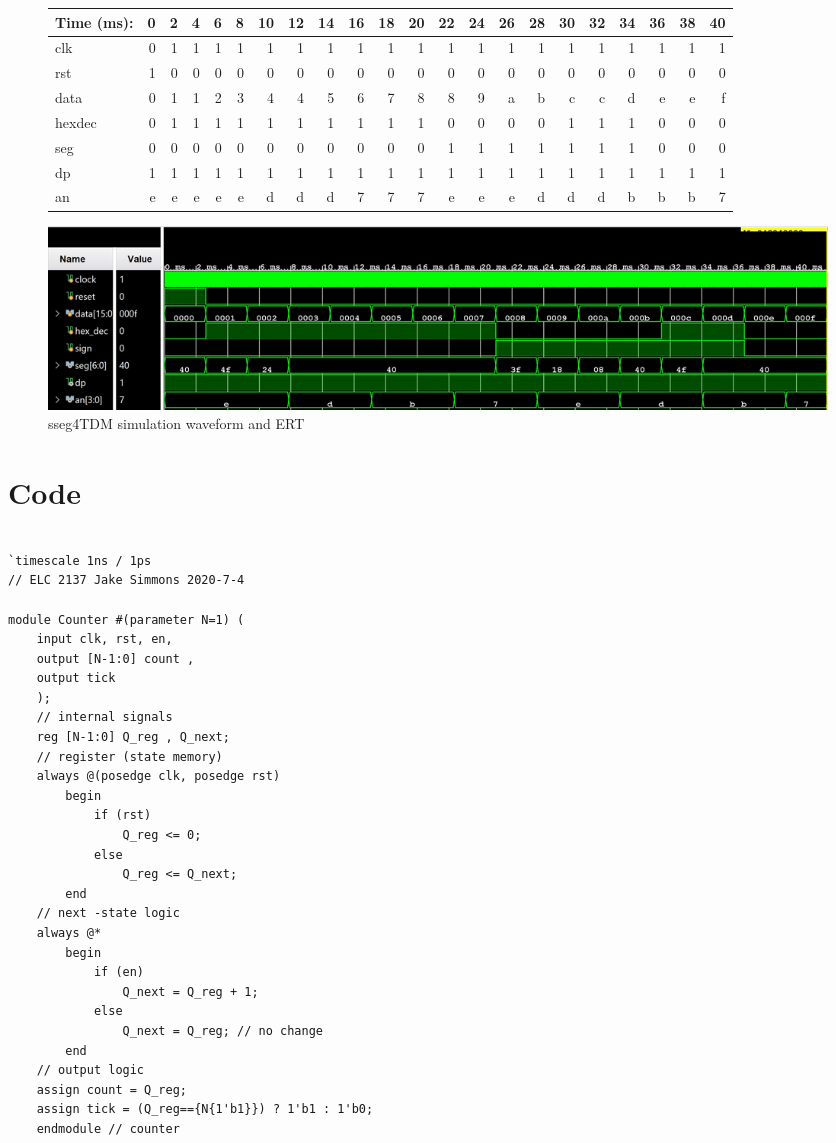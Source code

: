\documentclass[11pt]{article}
\begin{document}
\begin{figure}[ht]\centering
	\begin{tabular}{l|rrrrrrrrrrrrrrrrrrrrr}
		Time (ms): & 0 & 2 & 4 & 6 & 8  & 10 & 12 & 14 & 16 & 18 & 20 & 22 & 24 & 26 & 28  & 30 & 32 & 34 & 36 & 38 & 40  \\
		\midrule
		clk & 0 & 1 & 1 & 1 & 1 & 1 & 1 & 1 & 1 & 1 & 1 & 1 & 1 & 1 & 1 & 1 & 1 & 1 & 1 & 1 & 1 \\
		rst & 1 & 0 & 0 & 0 & 0 & 0 & 0 & 0 & 0 & 0 & 0 & 0 & 0 & 0 & 0 & 0 & 0 & 0 & 0 & 0 & 0 \\
		data & 0 & 1 & 1 & 2 & 3 & 4 & 4 & 5 & 6 & 7 & 8 & 8 & 9 & a & b & c & c & d & e & e & f\\
		hexdec & 0 & 1 & 1 & 1 & 1 & 1 & 1 & 1 & 1 & 1 & 1 & 0 & 0 & 0 & 0 & 1 & 1 & 1 & 0 & 0 & 0 \\
		\midrule
		seg & 0 & 0 & 0 & 0 & 0 & 0 & 0 & 0 & 0 & 0 & 0 & 1 & 1 & 1 & 1 & 1 & 1 & 1 & 0 & 0 & 0\\
		dp & 1 & 1 & 1 & 1 & 1 & 1 & 1 & 1 & 1 & 1 & 1 & 1 & 1 & 1 & 1 & 1 & 1 & 1 & 1 & 1 & 1\\
		an & e & e & e & e & e & d & d & d & 7 & 7 & 7 & e & e & e & d & d & d & b & b & b & 7\\
		\bottomrule
	\end{tabular}\medskip
	
	\includegraphics[width=1.15 \textwidth]{sseg4_TDM_Test.JPG}
	\caption{sseg4TDM simulation waveform and ERT}
	\label{fig:sim_with_table}
\end{figure}

\clearpage
\section*{Code}

\begin{lstlisting}[style=Verilog,
caption=Counter Module,
label=counter 
]

`timescale 1ns / 1ps
// ELC 2137 Jake Simmons 2020-7-4

module Counter #(parameter N=1) ( 
	input clk, rst, en, 
	output [N-1:0] count , 
	output tick 
	);
	// internal signals 
	reg [N-1:0] Q_reg , Q_next;
	// register (state memory) 
	always @(posedge clk, posedge rst) 
		begin 
			if (rst) 
				Q_reg <= 0; 
			else 
				Q_reg <= Q_next; 
		end
	// next -state logic 
	always @* 
		begin 
			if (en) 
				Q_next = Q_reg + 1; 
			else 
				Q_next = Q_reg; // no change 
		end
	// output logic 
	assign count = Q_reg; 
	assign tick = (Q_reg=={N{1'b1}}) ? 1'b1 : 1'b0;
	endmodule // counter
\end{lstlisting}
\end{document}
